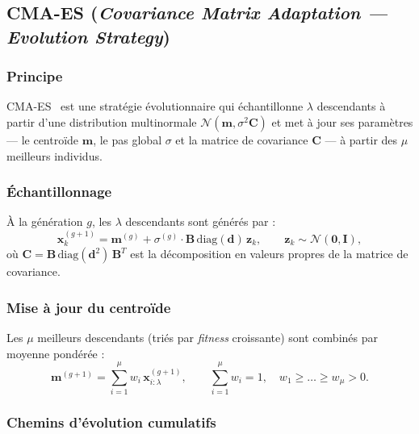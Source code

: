 \subsection{CMA-ES (\emph{Covariance Matrix Adaptation — Evolution Strategy})}
\label{sec:cmaes}

\subsubsection{Principe}

CMA-ES~\cite{hansen2001,hansen2016} est une stratégie évolutionnaire qui
échantillonne $\lambda$ descendants à partir d'une distribution multinormale
$\mathcal{N}(\mathbf{m}, \sigma^2 \mathbf{C})$ et met à jour ses paramètres
--- le centroïde $\mathbf{m}$, le pas global $\sigma$ et la matrice de
covariance $\mathbf{C}$ --- à partir des $\mu$ meilleurs individus.

\subsubsection{Échantillonnage}

À la génération $g$, les $\lambda$ descendants sont générés par :
\begin{equation}
\label{eq:cma-sample}
  \mathbf{x}_k^{(g+1)} = \mathbf{m}^{(g)} + \sigma^{(g)} \cdot
  \mathbf{B}\,\text{diag}(\mathbf{d})\,\mathbf{z}_k,
  \qquad \mathbf{z}_k \sim \mathcal{N}(\mathbf{0}, \mathbf{I}),
\end{equation}
où $\mathbf{C} = \mathbf{B}\,\text{diag}(\mathbf{d}^2)\,\mathbf{B}^T$ est la
décomposition en valeurs propres de la matrice de covariance.

\subsubsection{Mise à jour du centroïde}

Les $\mu$ meilleurs descendants (triés par \textit{fitness} croissante) sont combinés
par moyenne pondérée :
\begin{equation}
  \mathbf{m}^{(g+1)} = \sum_{i=1}^{\mu} w_i \, \mathbf{x}_{i:\lambda}^{(g+1)},
  \qquad \sum_{i=1}^{\mu} w_i = 1, \quad w_1 \geq \ldots \geq w_\mu > 0.
\end{equation}

\subsubsection{Chemins d'évolution cumulatifs}

